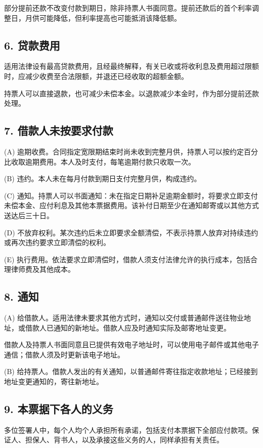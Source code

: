 \documentclass[UTF8,fontset=none,11pt,a4paper]{ctexart}
\begin{document}
部分提前还款不改变付款到期日，除非持票人书面同意。提前还款后的首个利率调整日，月供可能降低，但利率提高也可能抵消该降低额。


\subsection*{6. 贷款费用}
适用法律设有最高贷款费用，且经最终解释，有关已收或将收利息及费用超过限额时，应减少收费至合法限额，并退还已经收取的超额金额。


持票人可以直接退款，也可减少未偿本金。以退款减少本金时，作为部分提前还款处理。


\subsection*{7. 借款人未按要求付款}
(A) 逾期收费。合同指定宽限期结束时尚未收到完整月供，持票人可以按约定百分比收取逾期费用。本人及时支付，每笔逾期付款只收取一次。


(B) 违约。本人未在每月付款到期日支付完整月供，构成违约。


(C) 通知。持票人可以书面通知：未在指定日期补足逾期金额时，将要求立即支付未偿本金、应付利息及其他本票据费用。该补付日期至少在通知邮寄或以其他方式送达后三十日。


(D) 不放弃权利。某次违约后未立即要求全额清偿，不表示持票人放弃对持续违约或再次违约要求立即清偿的权利。


(E) 执行费用。依法要求立即清偿时，借款人须支付法律允许的执行成本，包括合理律师费及其他成本。


\subsection*{8. 通知}
(A) 给借款人。适用法律未要求其他方式时，通知以交付或普通邮件送往物业地址，或借款人已通知的新地址。借款人应及时通知实际及邮寄地址变更。


借款人及持票人书面同意且已提供有效电子地址时，可以使用电子邮件或其他电子通信；借款人须及时更新该电子地址。


(B) 给持票人。借款人发出的有关通知，以普通邮件寄往指定收款地址；已经接到地址变更通知的，寄往新地址。


\subsection*{9. 本票据下各人的义务}
多位签署人中，每个人均个人承担所有承诺，包括支付本票据下全部应付款项。保证人、担保人、背书人，以及承接这些义务的人，同样承担有关责任。
\end{document}
